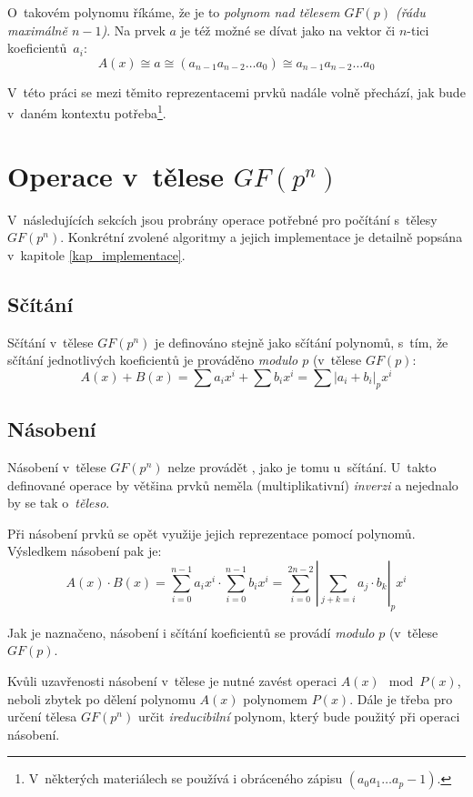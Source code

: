 \documentclass[thesis=M,czech,hidelinks]{FITthesis}[2012/06/26]
\newcommand{\0}{{\textcolor[gray]{0.80}{0}}}
\begin{document}
O~takovém polynomu říkáme, že je to \emph{polynom nad tělesem $GF(p)$ (řádu
maximálně $n-1$)}. Na prvek $a$ je též možné se dívat jako na vektor či $n$-tici
koeficientů~$a_i$:
$$ A(x) \cong a \cong (a_{n-1} a_{n-2} \ldots a_0) \cong a_{n-1} a_{n-2}
\ldots a_0 $$

V~této práci se mezi těmito reprezentacemi prvků nadále volně přechází, jak
bude v~daném kontextu potřeba\footnote{
    V~některých materiálech se používá i obráceného zápisu
    $(a_0 a_1 \ldots a_p-1)$.
}.

\section{Operace v~tělese $GF(p^n)$}
V~následujících sekcích jsou probrány operace potřebné pro počítání
s~tělesy $GF(p^n)$. Konkrétní zvolené algoritmy a jejich implementace
je detailně popsána v~kapitole \ref{kap_implementace}.

\subsection{Sčítání}
Sčítání v~tělese $GF(p^n)$ je definováno stejně jako sčítání polynomů, s~tím, že
sčítání jednotlivých koeficientů je prováděno \emph{modulo $p$} (v~tělese $GF(p)$:
$$ A(x) + B(x) = \sum a_i x^i + \sum b_i x^i = \sum \left|a_i + b_i\right|_p x^i $$


\subsection{Násobení}
Násobení v~tělese $GF(p^n)$ nelze provádět , jako je tomu
u~sčítání. U~takto definované operace by většina prvků neměla (multiplikativní)
\emph{inverzi} a nejednalo by se tak o~\emph{těleso}.

Při násobení prvků se opět využije jejich reprezentace pomocí polynomů.
Výsledkem násobení pak je:
$$ A(x) \cdot B(x) = \sum_{i=0}^{n-1} a_i x^i \cdot \sum_{i=0}^{n-1} b_i x^i =
\sum_{i=0}^{2n-2} \left|\sum_{j+k=i} a_j \cdot b_k\right|_p x^i$$

Jak je naznačeno, násobení i sčítání koeficientů se provádí \emph{modulo} $p$
(v~tělese $GF(p)$.

Kvůli uzavřenosti násobení v~tělese je nutné zavést operaci $A(x) \mod P(x)$,
neboli zbytek po dělení polynomu $A(x)$ polynomem $P(x)$. Dále je třeba pro
určení tělesa $GF(p^n)$ určit \emph{ireducibilní} polynom, který bude použitý
při operaci násobení.
\end{document}

